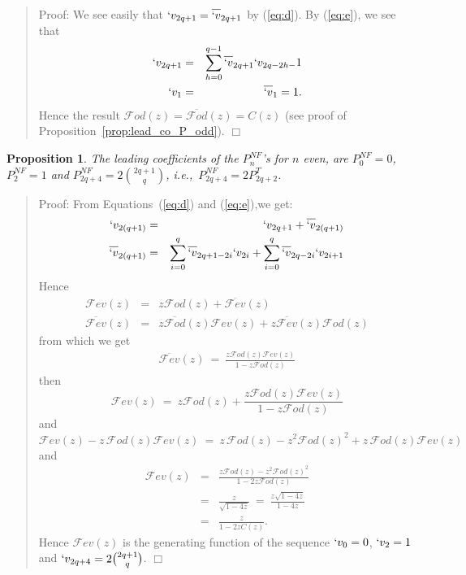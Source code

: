 \documentclass[preprint,authoryear]{elsarticle}
\newenvironment{proof}[1]{\begin{quotation}\noindent\textsf{Proof:} #1}{\(\Box\)\end{quotation}}
\newtheorem{prop}{Proposition}
\newcommand{\ie}{i.e.,~}
\newcommand{\Fev}{\mathcal{F}ev}
\newcommand{\Fevb}{\overline{\mathcal{F}ev}}
\newcommand{\Fod}{\mathcal{F}od}
\newcommand{\Fodb}{\overline{\mathcal{F}od}}
\newcommand{\phib}[1]{\overline{`v}_{#1}}
\begin{document}
  \begin{proof}{}
    We see easily that $`v_{2q+1} = \phib{2q+1}$ by (\ref{eq:d}).  By (\ref{eq:e}), we see
    that
    \begin{eqnarray*}
      `v_{2q+1} &=& \sum_{h=0}^{q-1} \phib{2q+1}`v_{2q-2h-}1\\
      `v_1 &=& \phib{1} = 1.
    \end{eqnarray*}
    Hence the result $\Fod(z) = \Fodb(z) = C(z)$ (see proof of
    Proposition~\ref{prop:lead_co_P_odd}).
  \end{proof}
  \begin{prop}\label{prop:Fev}
    The leading coefficients of the $P^{NF}_n$'s for $n$ even, are $P^{NF}_0 =0$, $P^{NF}_2
    =1$ and $P^{NF}_{2q+4} = 2{2q+1 \choose q}$, 
    \ie $P^{NF}_{2q+4} = 2P^T_{2q+2}$.
  \end{prop}
  \begin{proof}{}
    From Equations~(\ref{eq:d}) and (\ref{eq:e}),we get:
    \begin{eqnarray*}
      `v_{2(q+1)} &=& `v_{2q+1} + \phib{2(q+1)}\\
      \phib{2(q+1)} &=& \sum_{i=0}^q \phib{2q+1-2i} `v_{2i} + \sum_{i=0}^q \phib{2q-2i} `v_{2i+1} 
    \end{eqnarray*}
Hence
\begin{eqnarray*}
  \Fev(z) &=& z \Fod(z) + \Fevb(z)\\
\Fevb(z) &=& z \Fodb(z)\Fev(z) + z \Fevb(z) \Fod(z)
\end{eqnarray*}
from which we get 
\begin{eqnarray} \label{eq:Fevb}
  \Fevb(z) \ = \ \frac{z\Fod(z)\Fev(z)}{1-z \Fod(z)}
\end{eqnarray}
then
\begin{displaymath}
  \Fev(z) \ = \ z\Fod(z) + \frac{z\Fod(z)\Fev(z)}{1-z \Fod(z)}
\end{displaymath}
and
\begin{displaymath}
  \Fev(z) - z \,\Fod(z)\Fev(z) \ = \ z\, \Fod(z) - z^2\Fod(z)^2 + z\, \Fod(z)\Fev(z)
\end{displaymath}
and
\begin{eqnarray*}
  \Fev(z) &=&\frac{z \Fod(z) - z^2\Fod(z)^2}{1-2z \Fod(z)}\\
    &=& \frac{z}{\sqrt{1-4z}} \ = \ \frac{z\sqrt{1-4z}}{1-4z} \\
    &=& \frac{z}{1-2zC(z)}.
\end{eqnarray*}
Hence $\Fev(z)$ is the generating function of the sequence $`v_0=0$, $`v_2=1$ and
$`v_{2q+4} = 2{2q+1 \choose q}$.
  \end{proof}
\end{document}
